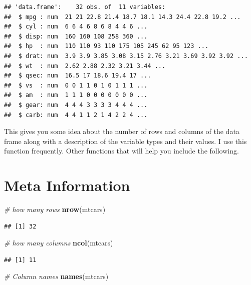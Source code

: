 \documentclass[]{book}
\newenvironment{Shaded}{\begin{snugshade}}{\end{snugshade}}
\newcommand{\CommentTok}[1]{\textcolor[rgb]{0.56,0.35,0.01}{\textit{#1}}}
\newcommand{\KeywordTok}[1]{\textcolor[rgb]{0.13,0.29,0.53}{\textbf{#1}}}
\newcommand{\NormalTok}[1]{#1}
\begin{document}
\begin{verbatim}
## 'data.frame':    32 obs. of  11 variables:
##  $ mpg : num  21 21 22.8 21.4 18.7 18.1 14.3 24.4 22.8 19.2 ...
##  $ cyl : num  6 6 4 6 8 6 8 4 4 6 ...
##  $ disp: num  160 160 108 258 360 ...
##  $ hp  : num  110 110 93 110 175 105 245 62 95 123 ...
##  $ drat: num  3.9 3.9 3.85 3.08 3.15 2.76 3.21 3.69 3.92 3.92 ...
##  $ wt  : num  2.62 2.88 2.32 3.21 3.44 ...
##  $ qsec: num  16.5 17 18.6 19.4 17 ...
##  $ vs  : num  0 0 1 1 0 1 0 1 1 1 ...
##  $ am  : num  1 1 1 0 0 0 0 0 0 0 ...
##  $ gear: num  4 4 4 3 3 3 3 4 4 4 ...
##  $ carb: num  4 4 1 1 2 1 4 2 2 4 ...
\end{verbatim}

This gives you some idea about the number of rows and columns of the data frame along with a description of the variable types and their values. I use this function frequently. Other functions that will help you include the following.

\hypertarget{meta-information}{%
\section{Meta Information}\label{meta-information}}

\begin{Shaded}
\begin{Highlighting}[]
\CommentTok{# how many rows}
\KeywordTok{nrow}\NormalTok{(mtcars) }
\end{Highlighting}
\end{Shaded}

\begin{verbatim}
## [1] 32
\end{verbatim}

\begin{Shaded}
\begin{Highlighting}[]
\CommentTok{# how many columns}
\KeywordTok{ncol}\NormalTok{(mtcars) }
\end{Highlighting}
\end{Shaded}

\begin{verbatim}
## [1] 11
\end{verbatim}

\begin{Shaded}
\begin{Highlighting}[]
\CommentTok{# Column names}
\KeywordTok{names}\NormalTok{(mtcars)}
\end{Highlighting}
\end{Shaded}
\end{document}

